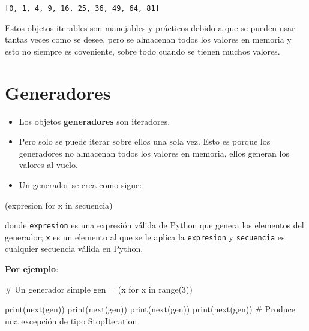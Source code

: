 \documentclass[
  letterpaper,
  DIV=11,
  numbers=noendperiod]{scrreprt}
\newenvironment{Shaded}{\begin{snugshade}}{\end{snugshade}}
\newcommand{\BuiltInTok}[1]{\textcolor[rgb]{0.00,0.23,0.31}{#1}}
\newcommand{\CommentTok}[1]{\textcolor[rgb]{0.37,0.37,0.37}{#1}}
\newcommand{\ControlFlowTok}[1]{\textcolor[rgb]{0.00,0.23,0.31}{#1}}
\newcommand{\DecValTok}[1]{\textcolor[rgb]{0.68,0.00,0.00}{#1}}
\newcommand{\KeywordTok}[1]{\textcolor[rgb]{0.00,0.23,0.31}{#1}}
\newcommand{\NormalTok}[1]{\textcolor[rgb]{0.00,0.23,0.31}{#1}}
\newcommand{\OperatorTok}[1]{\textcolor[rgb]{0.37,0.37,0.37}{#1}}
\begin{document}
\begin{verbatim}
[0, 1, 4, 9, 16, 25, 36, 49, 64, 81]
\end{verbatim}

Estos objetos iterables son manejables y prácticos debido a que se
pueden usar tantas veces como se desee, pero se almacenan todos los
valores en memoria y esto no siempre es coveniente, sobre todo cuando se
tienen muchos valores.


\chapter{Generadores}\label{generadores}

\begin{itemize}
\item
  Los objetos \textbf{generadores} son iteradores.
\item
  Pero solo se puede iterar sobre ellos una sola vez. Esto es porque los
  generadores no almacenan todos los valores en memoria, ellos generan
  los valores al vuelo.
\item
  Un generador se crea como sigue:
\end{itemize}

\begin{Shaded}
\begin{Highlighting}[]
\NormalTok{(expresion }\ControlFlowTok{for}\NormalTok{ x }\KeywordTok{in}\NormalTok{ secuencia)}
\end{Highlighting}
\end{Shaded}

donde \texttt{expresion} es una expresión válida de Python que genera
los elementos del generador; \texttt{x} es un elemento al que se le
aplica la \texttt{expresion} y \texttt{secuencia} es cualquier secuencia
válida en Python.

\textbf{Por ejemplo}:

\begin{Shaded}
\begin{Highlighting}[]
\CommentTok{\# Un generador simple}
\NormalTok{gen }\OperatorTok{=}\NormalTok{ (x }\ControlFlowTok{for}\NormalTok{ x }\KeywordTok{in} \BuiltInTok{range}\NormalTok{(}\DecValTok{3}\NormalTok{))}

\BuiltInTok{print}\NormalTok{(}\BuiltInTok{next}\NormalTok{(gen))}
\BuiltInTok{print}\NormalTok{(}\BuiltInTok{next}\NormalTok{(gen))}
\BuiltInTok{print}\NormalTok{(}\BuiltInTok{next}\NormalTok{(gen))}
\BuiltInTok{print}\NormalTok{(}\BuiltInTok{next}\NormalTok{(gen)) }\CommentTok{\# Produce una excepción de tipo StopIteration}
\end{Highlighting}
\end{Shaded}
\end{document}
